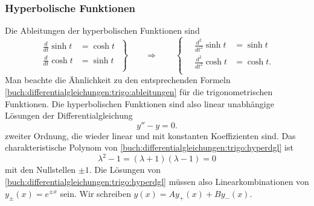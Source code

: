 \subsubsection{Hyperbolische Funktionen}
Die Ableitungen der hyperbolischen Funktionen sind
%
\begin{equation}
\left.
\begin{aligned}
\frac{d}{dt} \sinh t & = \cosh t \\
\frac{d}{dt} \cosh t & = \sinh t\\
\end{aligned}
\;
\right\}
\qquad\Rightarrow\qquad
\left\{\quad
\begin{aligned}
\frac{d^2}{dt^2}\sinh t&=\sinh t\phantom{.}\\
\frac{d^2}{dt^2}\cosh t&=\cosh t.\\
\end{aligned}\right.
\label{buch:differentialgleichungen:trigo:hyperabl}
\end{equation}
Man beachte die Ähnlichkeit zu den entsprechenden Formeln
\eqref{buch:differentialgleichungen:trigo:ableitungen}
für die trigonometrischen Funktionen.
Die hyperbolischen Funktionen sind also linear unabhängige Lösungen
der Differentialgleichung
%
\begin{equation}
y'' -y = 0.
\label{buch:differentialgleichungen:trigo:hyperdgl}
\end{equation}
zweiter Ordnung, die wieder linear und mit konstanten
Koeffizienten sind.
Das charakteristische Polynom von
%
\eqref{buch:differentialgleichungen:trigo:hyperdgl}
ist
\[
\lambda^2-1 = (\lambda+1)(\lambda-1) = 0
\]
mit den Nullstellen $\pm 1$.
Die Lösungen von
\eqref{buch:differentialgleichungen:trigo:hyperdgl}
müssen also Linearkombinationen von $y_{\pm}(x)=e^{\pm x}$ sein.
Wir schreiben $y(x)=Ay_+(x)+By_-(x)$.


